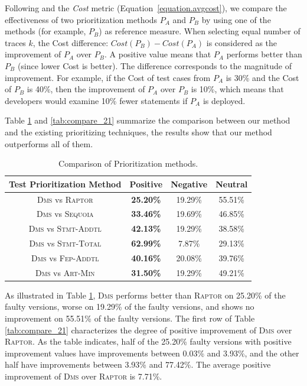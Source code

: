 Following \cite{BaahPH10,BaahPH11} and the {\em Cost}
metric (Equation~\ref{equation.avgcost}), we compare
the effectiveness of two prioritization methods $P_A$ and $P_B$ by using
one of the methods (for example, $P_B$) as reference measure.
When selecting equal number of traces $k$, the Cost difference:
$Cost(P_B) - Cost(P_A)$ is considered as the improvement of $P_A$
over $P_B$. A positive value means that $P_A$ performs better than
$P_B$ (since lower Cost is better). The difference corresponds
to the magnitude of improvement. For example, if the Cost of
test cases from $P_A$ is 30\% and the Cost of $P_B$ is 40\%,
then the improvement of $P_A$ over $P_B$ is 10\%, which means
that developers would examine 10\% fewer statements if $P_A$
is deployed.

\vspace{0.2cm}
 Table \ref{tab:compare_11} and \ref{tab:compare_21} summarize the comparison
between our method and the existing prioritizing techniques, the results show that
our method outperforms all of them.

\begin{table}[!htbp]
    \centering
		\caption{Comparison of Prioritization methods.}
		\renewcommand{\arraystretch}{1.5}
		\small
        \begin{tabular}{|c|c|c|c|}
			\hline
			Test Prioritization Method  &  Positive  &  Negative  &   Neutral  \\
			\hline\hline
			\textsc{Dms} vs \textsc{Raptor} & {\bf 25.20\%} &    19.29\% &    55.51\% \\
			\hline
			\textsc{Dms} vs \textsc{Sequoia} & {\bf 33.46\%} &    19.69\% &    46.85\% \\
			\hline
			\textsc{Dms} vs \textsc{Stmt-Addtl} & {\bf 42.13\%} &    19.29\% &    38.58\% \\
			\hline
			\textsc{Dms} vs \textsc{Stmt-Total} & {\bf 62.99\%} &     7.87\% &    29.13\% \\
			\hline
			\textsc{Dms} vs \textsc{Fep-Addtl} & {\bf 40.16\%} &    20.08\% &    39.76\% \\
			\hline
			\textsc{Dms} vs \textsc{Art-Min} & {\bf 31.50\%} &    19.29\% &    49.21\% \\
			\hline
		\end{tabular}
    \label{tab:compare_11}
\end{table}

As illustrated in Table \ref{tab:compare_11}, \textsc{Dms} performs
better than \textsc{Raptor} on 25.20\% of the faulty versions, worse
on 19.29\% of the faulty versions, and shows no improvement
on 55.51\% of the faulty versions. The first row of
Table \ref{tab:compare_21} characterizes the degree of positive improvement of
\textsc{Dms} over \textsc{Raptor}. As the table indicates, half of the 25.20\%
faulty versions with positive improvement values have improvements
between 0.03\% and 3.93\%, and the other half
have improvements between 3.93\% and 77.42\%. The average
positive improvement of \textsc{Dms} over \textsc{Raptor} is 7.71\%.

